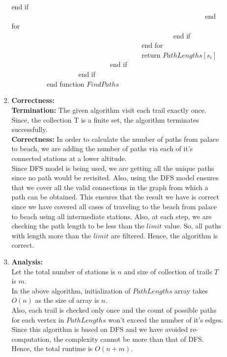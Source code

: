 \documentclass[12pt]{article}
\begin{document}
\begin{enumerate}
\begin{enumerate}
\begin{enumerate}
\verb|			|\verb|			|\verb|			|\verb|			|\verb|			|\verb|			|\verb|			|end if\\
\verb|			|\verb|			|\verb|			|\verb|			|\verb|			|\verb|			|end for\\
\verb|			|\verb|			|\verb|			|\verb|			|\verb|			|end if\\
\verb|			|\verb|			|\verb|			|\verb|			|end for\\
\verb|			|\verb|			|\verb|			|\verb|			|return $PathLengths[s_i]$\\
\verb|			|\verb|			|\verb|			|end if\\
\verb|			|\verb|			|end if\\
\verb|			|end function $FindPaths$\\
\item \textbf{Correctness:}\\
\textbf{Termination:} The given algorithm visit each trail exactly once. Since, the collection T is a finite set, the algorithm terminates successfully.\\
\textbf{Correctness:} In order to calculate the number of paths from palace to beach, we are adding the number of paths via each of it's connected stations at a lower altitude.\\
Since DFS model is being used, we are getting all the unique paths since no path would be revisited. Also, using the DFS model ensures that we cover all the valid connections in the graph from which
a path can be obtained. This ensures that the result we have is correct since we have covered all cases of traveling to the beach from palace to beach using all intermediate stations. Also, at each step, we are checking the path length to be less than the $limit$ value. So, all paths with length more than the $limit$ are filtered. Hence, the algorithm is correct.\\
\item \textbf{Analysis:}\\
Let the total number of stations is $n$ and size of collection of trails $T$ is $m$.\\
In the above algorithm, initialization of $PathLengths$ array takes $O(n)$ as the size of array is $n$.\\
Also, each trail is checked only once and the count of possible paths for each vertex in $PathLengths$ won't exceed the number of it's edges.\\
Since this algorithm is based on DFS and we have avoided re-computation, the complexity cannot be more than that of DFS.\\   Hence, the total runtime is $O(n+m)$. \\

\end{enumerate}
\end{enumerate}
\end{enumerate}
\end{document}

